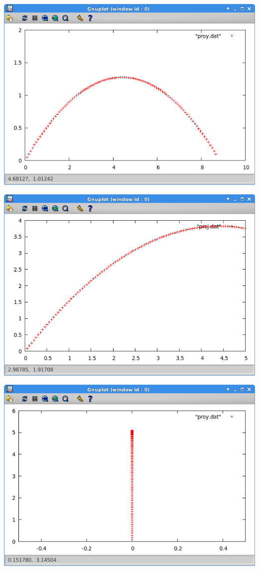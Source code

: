 \documentclass[12pt]{article}
\begin{document}
            \newpage
 

 \centering
\includegraphics[scale=0.5]{30.png}

 

 \centering
\includegraphics[scale=0.5]{60.png}

 
 


 \centering
\includegraphics[scale=0.5]{90.png}
\end{document}
